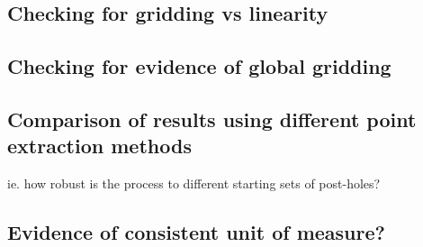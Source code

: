 \documentclass[../../ArchStats.tex]{subfiles}
\begin{document}
\subsection{Checking for gridding vs linearity}

\subsection{Checking for evidence of global gridding}


\subsection{Comparison of results using different point extraction methods}
ie. how robust is the process to different starting sets of post-holes?

\subsection{Evidence of consistent unit of measure?}
\end{document}
